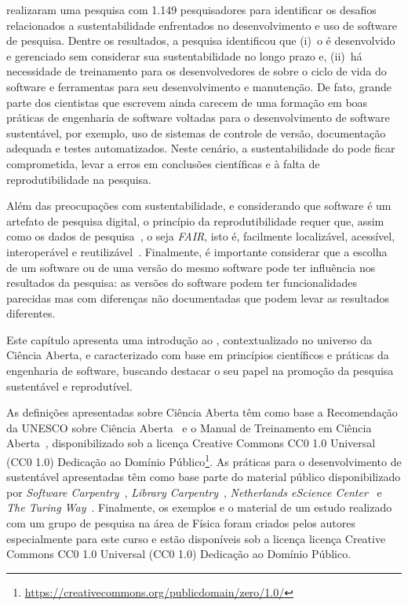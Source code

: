 \cite{carver:rs:2022} realizaram uma pesquisa com 1.149 pesquisadores para identificar os desafios relacionados a sustentabilidade enfrentados no desenvolvimento e uso de software de pesquisa. 
Dentre os resultados, a pesquisa identificou que (i)~o \RSw é desenvolvido e gerenciado sem considerar sua sustentabilidade no longo prazo e, 
(ii)~há necessidade de treinamento para os desenvolvedores de \RSw sobre o ciclo de vida do software e ferramentas para seu desenvolvimento e manutenção.
De fato, grande parte dos cientistas que escrevem \RSw ainda carecem de uma formação em boas práticas de engenharia de software voltadas para o desenvolvimento de software sustentável, por exemplo, uso de sistemas de controle de versão, documentação adequada e testes automatizados.
Neste cenário, a sustentabilidade do \RSw pode ficar comprometida, levar a erros em conclusões científicas e à falta de reprodutibilidade na pesquisa.

Além das preocupações com sustentabilidade, e considerando que software é um artefato de pesquisa digital, o princípio da reprodutibilidade requer que, assim como os dados de pesquisa~\cite{Wilkinson2016}, o \RSw seja \textit{FAIR}, isto é, facilmente localizável, acessível, interoperável e reutilizável~\cite{chue_hong_fair_2022}.
Finalmente, é importante considerar que a escolha de um software ou de uma versão do mesmo software pode ter influência nos resultados da pesquisa: 
as versões do software podem ter funcionalidades parecidas mas com diferenças não documentadas que podem levar as resultados diferentes.

Este capítulo apresenta uma introdução ao \RS, contextualizado no universo da Ciência Aberta, e caracterizado com base em
princípios científicos e práticas da engenharia de software, 
buscando destacar o seu papel na promoção da pesquisa sustentável e reprodutível.


As definições apresentadas sobre Ciência Aberta têm como base 
a Recomendação da UNESCO sobre Ciência Aberta~\cite{unesco:2021} 
e o Manual de Treinamento em Ciência Aberta~\cite{training:handbook}, disponibilizado sob a licença Creative Commons CC0 1.0 Universal (CC0 1.0) Dedicação ao Domínio Público\footnote{\url{https://creativecommons.org/publicdomain/zero/1.0/}}. 
%
As práticas para o desenvolvimento de \RSw sustentável apresentadas têm como base parte do material público disponibilizado por
\textit{Software Carpentry}~\cite{madicken_munk_2019_3264950, aleksandra_nenadic_2022_6532057}, 
\textit{Library Carpentry}~\cite{madicken_munk_2019_3264950}, 
\textit{Netherlands eScience Center}~\cite{drost_niels_2020_4020622} e 
\textit{The Turing Way}~\cite{the_turing_way_community_2022_7625728}.
%
Finalmente, os exemplos e o material de um estudo realizado com um grupo de pesquisa na área de Física foram criados pelos autores especialmente para este curso e estão disponíveis sob a licença 
licença Creative Commons CC0 1.0 Universal (CC0 1.0)
Dedicação ao Domínio Público.


